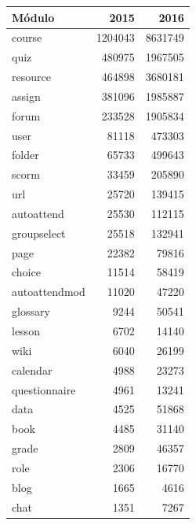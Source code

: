 \begin{table}[H]
\centering
\begin{tabular}{|l|r|r|}
\hline
\textbf{Módulo} & \textbf{2015} & \textbf{2016} \\ \hline
course          & 1204043       & 8631749       \\ \hline
quiz            & 480975        & 1967505       \\ \hline
resource        & 464898        & 3680181       \\ \hline
assign          & 381096        & 1985887       \\ \hline
forum           & 233528        & 1905834       \\ \hline
user            & 81118         & 473303        \\ \hline
folder          & 65733         & 499643        \\ \hline
scorm           & 33459         & 205890        \\ \hline
url             & 25720         & 139415        \\ \hline
autoattend      & 25530         & 112115        \\ \hline
groupselect     & 25518         & 132941        \\ \hline
page            & 22382         & 79816         \\ \hline
choice          & 11514         & 58419         \\ \hline
autoattendmod   & 11020         & 47220         \\ \hline
glossary        & 9244          & 50541         \\ \hline
lesson          & 6702          & 14140         \\ \hline
wiki            & 6040          & 26199         \\ \hline
calendar        & 4988          & 23273         \\ \hline
questionnaire   & 4961          & 13241         \\ \hline
data            & 4525          & 51868         \\ \hline
book            & 4485          & 31140         \\ \hline
grade           & 2809          & 46357         \\ \hline
role            & 2306          & 16770         \\ \hline
blog            & 1665          & 4616          \\ \hline
chat            & 1351          & 7267          \\ \hline

\end{tabular}
\end{table}
